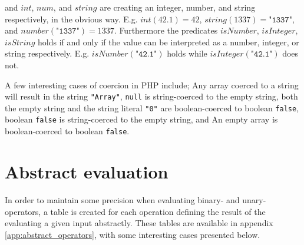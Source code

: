 and $\mathit{int}$, $\mathit{num}$, and $\mathit{string}$ are creating an integer, number, and string respectively, in the obvious way. E.g. $\mathit{int}(42.1) = 42$, $\mathit{string}(1337) = \texttt{"1337"}$, and $\mathit{number}(\texttt{"1337"}) = 1337$. Furthermore the predicates $\mathit{isNumber}$, $\mathit{isInteger}$, $\mathit{isString}$ holds if and only if the value can be interpreted as a number, integer, or string respectively. E.g. $\mathit{isNumber}(\texttt{"42.1"})$ holds while $\mathit{isInteger}(\texttt{"42.1"})$ does not.

A few interesting cases of coercion in PHP include; Any array coerced to a string will result in the string \texttt{"Array"}, \texttt{null} is string-coerced to the empty string, both the empty string and the string literal \texttt{"0"} are boolean-coerced to boolean \texttt{false}, boolean \texttt{false} is string-coerced to the empty string, and An empty array is boolean-coerced to boolean \texttt{false}.
\section{Abstract evaluation}
\label{sec:abseval}

In order to maintain some precision when evaluating binary- and unary-operators, a table is created for each operation defining the result of the evaluating a given input abstractly. These tables are available in appendix \ref{app:abstract_operators}, with some interesting cases presented below.


